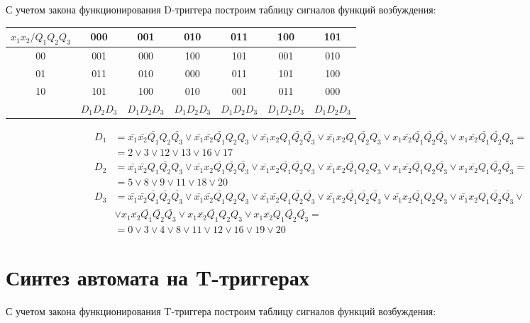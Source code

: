 \documentclass[listings]{labreport}
\begin{document}
С учетом закона функционирования D-триггера построим таблицу
сигналов функций возбуждения:

\begin{tabular}{|*{7}{c|}}
\hline
$x_1x_2/Q_1Q_2Q_3$ & 000 & 001 & 010 & 011 & 100 & 101\\\hline
00 & 001 & 000 & 100 & 101 & 001 & 010\\\hline
01 & 011 & 010 & 000 & 011 & 101 & 100\\\hline
10 & 101 & 100 & 010 & 001 & 011 & 000\\\hline
 & $D_1D_2D_3$ & $D_1D_2D_3$ & $D_1D_2D_3$ & $D_1D_2D_3$ & $D_1D_2D_3$ & $D_1D_2D_3$\\\hline
\end{tabular}

\begin{align*}
D_1 & = \bar{x_1}\bar{x_2}\bar{Q_1}Q_2\bar{Q_3} \lor \bar{x_1}\bar{x_2}\bar{Q_1}Q_2Q_3 \lor \bar{x_1}x_2Q_1\bar{Q_2}\bar{Q_3} \lor \bar{x_1}x_2Q_1\bar{Q_2}Q_3 \lor x_1\bar{x_2}\bar{Q_1}\bar{Q_2}\bar{Q_3} \lor x_1\bar{x_2}\bar{Q_1}\bar{Q_2}Q_3 = \\ & = 2 \lor 3 \lor 12 \lor 13 \lor 16 \lor 17 \\
D_2 & = \bar{x_1}\bar{x_2}Q_1\bar{Q_2}Q_3 \lor \bar{x_1}x_2\bar{Q_1}\bar{Q_2}\bar{Q_3} \lor \bar{x_1}x_2\bar{Q_1}\bar{Q_2}Q_3 \lor \bar{x_1}x_2\bar{Q_1}Q_2Q_3 \lor x_1\bar{x_2}\bar{Q_1}Q_2\bar{Q_3} \lor x_1\bar{x_2}Q_1\bar{Q_2}\bar{Q_3}       = \\ & = 5 \lor 8 \lor 9 \lor 11 \lor 18 \lor 20 \\
D_3 & = \bar{x_1}\bar{x_2}\bar{Q_1}\bar{Q_2}\bar{Q_3} \lor \bar{x_1}\bar{x_2}\bar{Q_1}Q_2Q_3 \lor \bar{x_1}\bar{x_2}Q_1\bar{Q_2}\bar{Q_3} \lor \bar{x_1}x_2\bar{Q_1}\bar{Q_2}\bar{Q_3} \lor \bar{x_1}x_2\bar{Q_1}Q_2Q_3 \lor \bar{x_1}x_2Q_1\bar{Q_2}\bar{Q_3} \lor \\ & \lor x_1\bar{x_2}\bar{Q_1}\bar{Q_2}\bar{Q_3} \lor x_1\bar{x_2}\bar{Q_1}Q_2Q_3 \lor x_1\bar{x_2}Q_1\bar{Q_2}\bar{Q_3} = \\ & = 0 \lor 3 \lor 4 \lor 8 \lor 11 \lor 12 \lor 16 \lor 19 \lor 20
\end{align*}

\section*{Синтез автомата на T-триггерах}

С учетом закона функционирования T-триггера построим таблицу
сигналов функций возбуждения:
\end{document}
